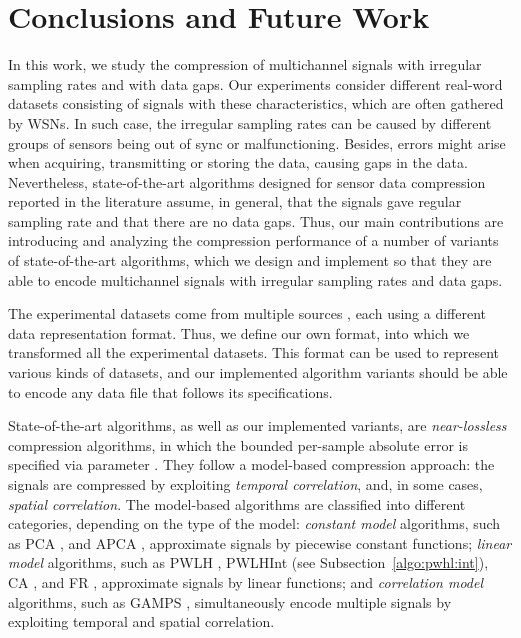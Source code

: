 
\chapter{Conclusions and Future Work} %
\label{conclusions} %



In this work, we study the compression of multichannel signals with irregular sampling rates and with data gaps. Our experiments consider different real-word datasets consisting of signals with these characteristics, which are often gathered by WSNs. In such case, the irregular sampling rates can be caused by different groups of sensors being out of sync or malfunctioning. Besides, errors might arise when acquiring, transmitting or storing the data, causing gaps in the data. Nevertheless, state-of-the-art algorithms designed for sensor data compression reported in the literature \cite{AnEva2013, Signal2016} assume, in general, that the signals gave regular sampling rate and that there are no data gaps. Thus, our main contributions are introducing and analyzing the compression performance of a number of variants of state-of-the-art algorithms, which we design and implement so that they are able to encode multichannel signals with irregular sampling rates and data gaps.


The experimental datasets come from multiple sources \dataCite, each using a different data representation format. Thus, we define our own format, into which we transformed all the experimental datasets. This format can be used to represent various kinds of datasets, and our implemented algorithm variants should be able to encode any data file that follows its specifications.


State-of-the-art algorithms, as well as our implemented variants, are \textit{near-lossless} compression algorithms, in which the bounded per-sample absolute error is specified via parameter \maxerror.
They follow a model-based compression approach: the signals are compressed by exploiting \textit{temporal correlation}, and, in some cases, \textit{spatial correlation}. The model-based algorithms are classified into different categories, depending on the type of the model: \textit{constant model} algorithms, such as PCA \cite{coder:pca}, and APCA \cite{coder:apca}, approximate signals by piecewise constant functions; \textit{linear model} algorithms, such as PWLH \cite{coder:pwlh}, PWLHInt (see Subsection~\ref{algo:pwhl:int}), CA \cite{coder:ca}, and FR \cite{coder:fr}, approximate signals by linear functions; and \textit{correlation model} algorithms, such as GAMPS \cite{coder:gamps}, simultaneously encode multiple signals by exploiting temporal and spatial correlation.


